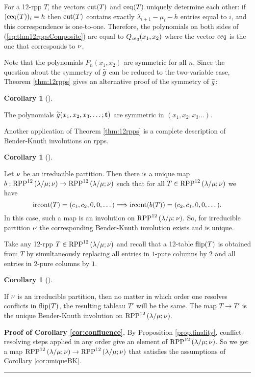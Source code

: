 \documentclass[numbers=enddot,12pt,final,onecolumn,notitlepage]{scrartcl}%
\theoremstyle{definition}
\newtheorem{coro}[theo]{Corollary}
\newenvironment{corollary}[1][]
{\begin{coro}[#1]\begin{leftbar}}
{\end{leftbar}\end{coro}}
\newenvironment{proof}[1][Proof]{\noindent\textbf{#1.} }{\ \rule{0.5em}{0.5em}}
\begin{document}
 For a 12-rpp $T$, the vectors ${\operatorname*{cut}}(T)$ and ${\operatorname*{ceq}}(T)$ uniquely determine each other: if $({\operatorname*{ceq}}(T))_i=h$ then ${\operatorname*{cut}}(T)$ contains exactly $\lambda_{i+1}-\mu_i-h$ entries equal to $i$, and this correspondence is one-to-one. Therefore, the polynomials on both sides of (\ref{eq:thm12rppsComposite}) are equal to $Q_{{{ceq}}}(x_1,x_2)$ where the vector ${{ceq}}$ is the one that corresponds to ${{\nu}}$.

 Note that the polynomials $P_n(x_1,x_2)$ are symmetric for all $n$. Since the question about the symmetry of ${\widetilde{g}}$ can be reduced to the two-variable case, Theorem \ref{thm:12rpps} gives an alternative proof of the symmetry of ${\widetilde{g}}$:
\begin{corollary}
 The polynomials ${\widetilde{g}}(x_1,x_2,x_3,\dots;{\mathbf{t}})$ are symmetric in $(x_1,x_2,x_3\dots)$.
\end{corollary}

Another application of Theorem \ref{thm:12rpps} is a complete description of Bender-Knuth involutions on rpps.

\begin{corollary}
\label{cor:uniqueBK}
Let ${{\nu}}$ be an irreducible partition. Then there is a unique map $b:{\operatorname*{RPP}^{12}\left( \lambda/\mu ;{{\nu}} \right)}\to{\operatorname*{RPP}^{12}\left( \lambda/\mu ;{{\nu}}\right)}$ such that for all $T\in{\operatorname*{RPP}^{12}\left( \lambda/\mu ;{{\nu}}\right)}$ we have 
$${\operatorname*{ircont}}(T)=(c_1,c_2,0,0,\dots)\Longrightarrow {\operatorname*{ircont}}(b(T))=(c_2,c_1,0,0,\dots).$$
In this case, such a map is an involution on ${\operatorname*{RPP}^{12}\left( \lambda/\mu ;{{\nu}} \right)}$. So, for irreducible partition ${{\nu}}$ the corresponding Bender-Knuth involution exists and is unique.
\end{corollary}

Take any 12-rpp $T\in{\operatorname*{RPP}^{12}\left( \lambda/\mu ;{{\nu}}\right)}$ and recall that a 12-table ${\operatorname*{flip}}(T)$ is obtained from $T$ by simultaneously replacing all entries in $1$-pure columns by $2$ and all entries in $2$-pure columns by $1$. 

\begin{corollary}
\label{cor:confluence}
 If ${{\nu}}$ is an irreducible partition, then no matter in which order one resolves conflicts in ${\operatorname*{flip}}(T)$, the resulting tableau $T'$ will be the same. The map $T\to T'$ is the unique Bender-Knuth involution on ${\operatorname*{RPP}^{12}\left( \lambda/\mu ;{{\nu}} \right)}$.
\end{corollary}
\begin{proof}[Proof of Corollary \ref{cor:confluence}]
 By Proposition \ref{prop.finality}, conflict-resolving steps applied in any order give an element of ${\operatorname*{RPP}^{12}\left( \lambda/\mu ;{{\nu}} \right)}$. So we get a map ${\operatorname*{RPP}^{12}\left( \lambda/\mu ;{{\nu}} \right)}\to {\operatorname*{RPP}^{12}\left( \lambda/\mu ;{{\nu}}\right)}$ that satisfies the assumptions of Corollary \ref{cor:uniqueBK}.
\end{proof}
\end{document}
